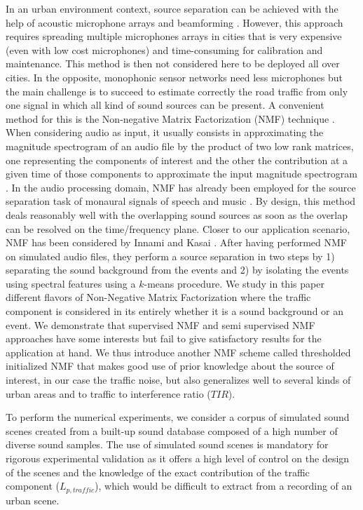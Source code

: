 \documentclass[twocolumn,a4paper,10pt]{article}
\begin{document}
In an urban environment context, source separation can be achieved with the help of acoustic microphone arrays and beamforming \cite{saruwatari2003blind}. However, this approach requires spreading multiple microphones arrays in cities that is very expensive (even with low cost microphones) and time-consuming for calibration and maintenance. This method is then not considered here to be deployed all over cities. In the opposite, monophonic sensor networks need less microphones but the main challenge is to succeed to estimate correctly the road traffic from only one signal in which all kind of sound sources can be present. A convenient method for this is the  Non-negative Matrix Factorization (NMF) technique \cite{lee_learning_1999}. When considering audio as input, it usually consists in approximating the magnitude spectrogram of an audio file by the product of two low rank matrices, one representing the components of interest and the other the contribution at a given time of those components to approximate the input magnitude spectrogram \cite{smaragdis_non-negative_2003} \cite{wilson_speech_2008} \cite{mesaros_sound_2015}. In the audio processing domain, NMF has already been employed for the source separation task of monaural signals of speech and music \cite{wang_musical_2005} \cite{wilson_speech_2008}. By design, this method deals reasonably well with the overlapping sound sources as soon as the overlap can be resolved on the time/frequency plane.
Closer to our application scenario, NMF has been considered by Innami and Kasai \cite{satoshi_innami_nmf-based_2012}. After having performed NMF on simulated audio files, they perform a source separation in two steps by 1) separating the sound background from the events and 2) by isolating the events using spectral features using a $k$-means procedure.
We study in this paper different flavors of Non-Negative Matrix Factorization where the traffic component is considered in its entirely whether it is a sound background or an event. We demonstrate that supervised NMF and semi supervised NMF approaches have some interests but fail to give satisfactory results for the application at hand. We thus introduce another NMF scheme called thresholded initialized NMF that makes good use of prior knowledge about the source of interest, in our case the traffic noise, but also generalizes well to several kinds of urban areas and to traffic to interference ratio ($TIR$).

To perform the numerical experiments, we consider a corpus of simulated sound scenes created from a built-up sound database composed of a high number of diverse sound samples. The use of simulated sound scenes is mandatory for rigorous experimental validation as it offers a high level of control on the design of the scenes and the knowledge of the exact contribution of the traffic component ($L_{p,traffic}$), which would be difficult to extract from a recording of an urban scene.
\end{document}
